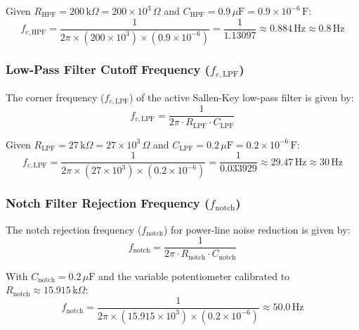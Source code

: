 Given $R_{\text{HPF}} = 200\,\text{k}\Omega = 200 \times 10^3\,\Omega$ and $C_{\text{HPF}} = 0.9\,\mu\text{F} = 0.9 \times 10^{-6}\,\text{F}$:
\begin{equation}
f_{c,\text{HPF}} = \frac{1}{2\pi \times (200 \times 10^3) \times (0.9 \times 10^{-6})} = \frac{1}{1.13097} \approx 0.884\,\text{Hz} \approx 0.8\,\text{Hz}
\label{eq:hpf_result}
\end{equation}

\FloatBarrier
\subsubsection{\texorpdfstring{Low-Pass Filter Cutoff Frequency ($f_{c,\text{LPF}}$)}{Low-Pass Filter Cutoff Frequency (fc,LPF)}}
\label{subsubsec:lpf_cutoff_calc}

The corner frequency ($f_{c,\text{LPF}}$) of the active Sallen-Key low-pass filter is given by:
\begin{equation}
f_{c,\text{LPF}} = \frac{1}{2\pi \cdot R_{\text{LPF}} \cdot C_{\text{LPF}}}
\label{eq:lpf_formula}
\end{equation}

Given $R_{\text{LPF}} = 27\,\text{k}\Omega = 27 \times 10^3\,\Omega$ and $C_{\text{LPF}} = 0.2\,\mu\text{F} = 0.2 \times 10^{-6}\,\text{F}$:
\begin{equation}
f_{c,\text{LPF}} = \frac{1}{2\pi \times (27 \times 10^3) \times (0.2 \times 10^{-6})} = \frac{1}{0.033929} \approx 29.47\,\text{Hz} \approx 30\,\text{Hz}
\label{eq:lpf_result}
\end{equation}

\FloatBarrier
\subsubsection{\texorpdfstring{Notch Filter Rejection Frequency ($f_{\text{notch}}$)}{Notch Filter Rejection Frequency (fnotch)}}
\label{subsubsec:notch_cutoff_calc}

The notch rejection frequency ($f_{\text{notch}}$) for power-line noise reduction is given by:
\begin{equation}
f_{\text{notch}} = \frac{1}{2\pi \cdot R_{\text{notch}} \cdot C_{\text{notch}}}
\label{eq:notch_formula}
\end{equation}

With $C_{\text{notch}} = 0.2\,\mu\text{F}$ and the variable potentiometer calibrated to $R_{\text{notch}} \approx 15.915\,\text{k}\Omega$:
\begin{equation}
f_{\text{notch}} = \frac{1}{2\pi \times (15.915 \times 10^3) \times (0.2 \times 10^{-6})} \approx 50.0\,\text{Hz}
\label{eq:notch_result}
\end{equation}

